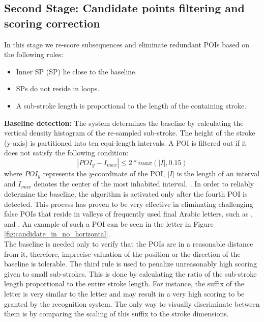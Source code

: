 \documentclass[10pt, conference, compsocconf]{IEEEtran}
\begin{document}
\subsection{Second Stage: Candidate points filtering and scoring correction}
In this stage we re-score subsequences and eliminate redundant POIs based on the following rules:

\begin{itemize}
	\item Inner SP (SP) lie close to the baseline. 
	\item SPs do not reside in loops.
	\item A sub-stroke length is proportional to the length of the containing stroke.\\
\end{itemize}

\textbf{Baseline detection:} The system determines the baseline by calculating the vertical density histogram of the re-sampled sub-stroke. 
The height of the stroke (y-axis) is partitioned into ten equi-length intervals. 
A POI is filtered out if it does not satisfy the following condition:
\begin{equation}
|POI_y-I_{max}| \leq 2*max{({|I|},0.15)} 
\end{equation}
where $POI_y$ represents the $y$-coordinate of the POI, $|I|$ is the length of an interval and $I_{max}$ denotes the center of the most inhabited interval. . In order to reliably determine the baseline, the algorithm is activated only after the fourth POI is detected. This process has proven to be very effective in eliminating challenging false POIs that reside in valleys of frequently used final Arabic letters, such as ,  and . An example of such a POI can be seen in the letter  in Figure \ref{fig:candidate_in_no_horizontal}. \\

The baseline is needed only to verify that the POIs are in a reasonable distance from it, therefore, imprecise valuation of the position or the direction of the baseline is tolerable.
The third rule is used to penalize unreasonably high scoring given to small sub-strokes. 
This is done by calculating the ratio of the sub-stroke length proportional to the entire stroke length.
For instance, the suffix of the letter  is very similar to the letter  and may result in a very high scoring to be granted by the recognition system. 
The only way to visually discriminate between them is by comparing the scaling of this suffix to the stroke dimensions.\\
\end{document}
